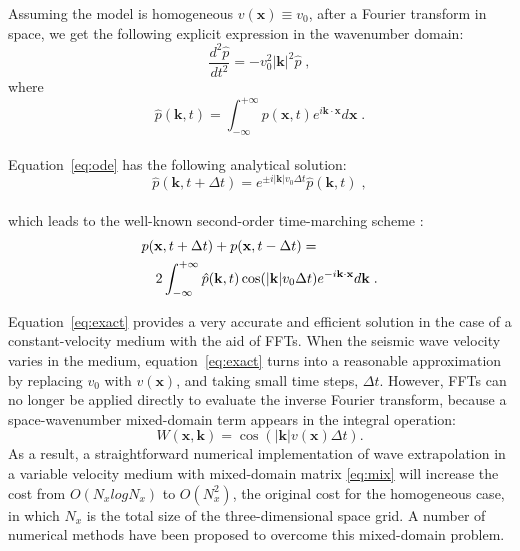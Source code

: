 Assuming the model is homogeneous $v(\mathbf{x}) \equiv v_0$,
after a Fourier transform in space,
 we get the following explicit expression in the wavenumber domain:
\begin{equation}
\label{eq:ode} 
\frac{d^2\hat{p}}{dt^2} = -v_0^2|\mathbf{k}|^2\hat{p}\;,
\end{equation}
where
\begin{equation}
\label{eq:p} 
\hat{p}(\mathbf{k},t)=\int^{+\infty}_{-\infty}{p(\mathbf{x},t)e^{i\mathbf{k}\cdot\mathbf{x}}d\mathbf{x}}\;.
\end{equation}
\\
Equation~\ref{eq:ode} has the following analytical solution:
\begin{equation}
\label{eq:fourier} 
\hat{p}(\mathbf{k},t+\Delta t) = e^{\pm i|\mathbf{k}|v_0\Delta t}\hat{p}(\mathbf{k},t)\;,
\end{equation}
\\
which leads to
the well-known second-order time-marching scheme \cite[]{Etgen.sep.60.131,yu}:
\begin{eqnarray}
\label{eq:exact} 
\lefteqn{p(\mathbf{x},t+\Delta t)+p(\mathbf{x},t-\Delta t)  = }\nonumber \\
& & 2\int^{+\infty}_{-\infty}{\hat{p}(\mathbf{k},t)\cos(|\mathbf{k}|v_0\Delta t)e^{-i\mathbf{k}\cdot\mathbf{x}}d\mathbf{k}}\;.
\end{eqnarray}

Equation~\ref{eq:exact} provides a very accurate and efficient solution
in the case of a constant-velocity medium with the aid of FFTs.
When the seismic wave velocity varies in the medium,
equation~\ref{eq:exact} turns into a reasonable approximation by replacing $v_0$ with $v(\mathbf{x})$, and taking small time steps, $\Delta t$.
However, FFTs can no longer be applied directly to evaluate
the inverse Fourier transform,
because a space-wavenumber mixed-domain term appears in the integral operation:
\begin{equation}
\label{eq:mix}
W(\mathbf{x},\mathbf{k})=\cos(|\mathbf{k}|v(\mathbf{x})\Delta t).
\end{equation}
As a result, a straightforward numerical implementation of wave extrapolation
in a variable velocity medium with mixed-domain
matrix \ref{eq:mix} will increase the cost from $O(N_xlogN_x)$ to $O(N_x^2)$,
the original cost for the homogeneous case,
in which $N_x$ is the total size of the three-dimensional space grid.
A number of numerical methods \cite[]{etgen,morton,zhang,du,ying,lr,songx,lfd,songxl}
have been proposed to overcome this mixed-domain problem.\\

